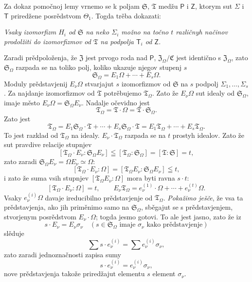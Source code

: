 \documentclass[11pt]{article}
\begin{document}
Za dokaz pomočnoj lemy vrnemo se k poljam \(\mathfrak S\), \(\mathfrak T\) medžu \(\mathsf P\) i \(\mathsf Z\), ktorym sut \(\Sigma\) i \(\mathsf T\) priredžene posrědstvom \(\Theta_1\). Togda trěba dokazati:

\emph{Vsaky izomorfizm \(H_i\) od \(\mathfrak S\) na neko \(\Sigma_i\) možno na točno \(t\) različnyh načinov prodolžiti do izomorfizmov od \(\mathfrak T\) na podpolja \(\mathsf T_i\) od \(\mathsf Z\).}

Zaradi prědpoloženja, že \(\mathfrak Z\) jest prvogo roda nad \(\mathsf P\), \(\mathfrak Z_\Omega/\mathfrak C\) jest identično s \(\mathfrak Z_\Omega\), zato \(\mathfrak S_\Omega\) razpada se na toliko polj, koliko ukazuje njegov stupenj \(s\)
\[
\mathfrak S_\Omega = E_1\Omega+\cdots+E_s\Omega .
\]
Moduly prědstavjenij \(E_\nu\Omega\) stvarjajut \(s\) izomorfizmov od \(\mathfrak S\) na \(s\) podpolj \(\Sigma_1,\ldots,\Sigma_s\). Za najdanje izomorfizmov od \(\mathfrak T\) potrěbujemo \(\mathfrak T_\Omega\). Zato že \(E_\nu\Omega\) sut idealy od \(\mathfrak S_\Omega\), imaje město \(E_\nu\Omega=\mathfrak S_\Omega E_\nu\). Nadalje očevidno jest
\[
\mathfrak T_\Omega=\mathfrak T\cdot\Omega=\mathfrak T\cdot\mathfrak S_\Omega .
\]
Zato jest
\[
\mathfrak T_\Omega
=E_1\mathfrak S_\Omega\cdot\mathfrak T+\cdots+E_s\mathfrak S_\Omega\cdot\mathfrak T
=E_1\mathfrak T_\Omega+\cdots+E_s\mathfrak T_\Omega .
\]
To jest razklad od \(\mathfrak T_\Omega\) na idealy. \(E_\nu\cdot\mathfrak T_\Omega\) razpada se na \(t\) prostyh idealov. Zato že sut pravdive relacije stupnjev
\[
[\mathfrak T_\Omega\cdot E_\nu:\mathfrak S_\Omega E_\nu]
\leqq [\mathfrak T_\Omega:\mathfrak S_\Omega]=[\mathfrak T:\mathfrak S]=t,
\]
zato zaradi \(\mathfrak S_\Omega E_\nu=\Omega E_\nu\simeq\Omega\):
\[
[\mathfrak T_\Omega\cdot E_\nu:\Omega]
=[\mathfrak T_\Omega E_\nu:\mathfrak S_\Omega E_\nu]\leqq t,
\]
i zato že suma vsih stupnjev \([\mathfrak T_\Omega E_\nu:\Omega]\) mora byti ravna \(s\cdot t\):
\[
[\mathfrak T_\Omega\cdot E_\nu:\Omega]=t,\qquad
E_\nu\mathfrak T_\Omega=e_\nu^{(1)}\cdot\Omega+\cdots+e_\nu^{(t)}\Omega .
\]
Vsaky \(e_\nu^{(i)}\Omega\) davaje ireducibilno prědstavjenje od \(\mathfrak T_\Omega\). \emph{Pokažimo ješče}, že vsa ta prědstavjenja, ako jih priměnimo samo na \(\mathfrak S_\Omega\), sběgajut se s prědstavjenjem, stvorjenym posrědstvom \(E_\nu\cdot\Omega\); togda jesmo gotovi. To ale jest jasno, zato že iz
\[
s\cdot E_\nu=E_\nu\sigma_\nu\quad
(s\in\mathfrak S_\Omega\text{ imaje }\sigma_\nu\text{ kako prědstavjenje})
\]
slěduje
\[
\sum s\cdot e_\nu^{(i)}=\sum e_\nu^{(i)}\sigma_\nu,
\]
zato zaradi jednoznačnosti zapisa sumy
\[
s\cdot e_\nu^{(i)}=e_\nu^{(i)}\sigma_\nu,
\]
nove prědstavjenja takože priredžajut elementu \(s\) element \(\sigma_\nu\).
\end{document}
